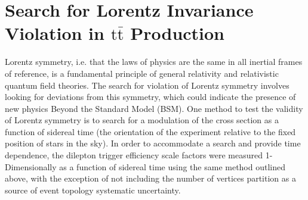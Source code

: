 \section{Search for Lorentz Invariance Violation in \ensuremath{\mathrm{t\bar{t}}} Production}
Lorentz symmetry, i.e. that the laws of physics are the same in all inertial frames of reference, is a fundamental principle of general relativity and relativistic quantum field theories.
The search for violation of Lorentz symmetry involves looking for deviations from this symmetry, which could indicate the presence of new physics Beyond the Standard Model (BSM).
One method to test the validity of Lorentz symmetry is to search for a modulation of the \ttbar cross section as a function of sidereal time (the orientation of the experiment relative to the fixed position of stars in the sky).
In order to accommodate a search and provide time dependence, the dilepton trigger efficiency scale factors were measured 1-Dimensionally as a function of sidereal time using the same method outlined above, with the exception of not including the number of vertices partition as a source of event topology systematic uncertainty.
